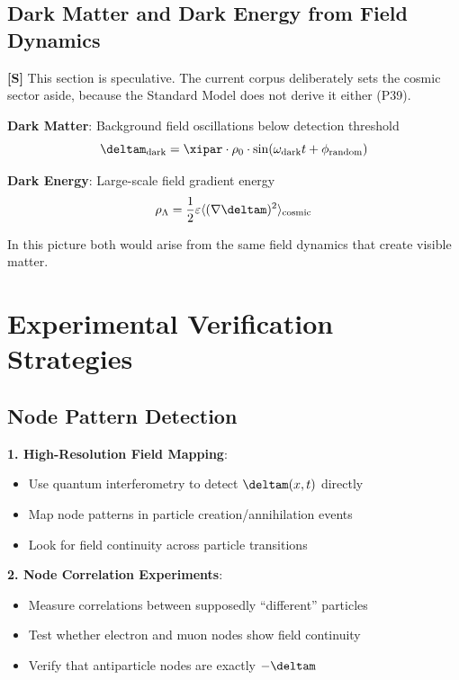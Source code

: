 	\subsection{Dark Matter and Dark Energy from Field Dynamics}
	
	\textbf{[S]} This section is speculative. The current corpus deliberately sets the cosmic sector aside, because the Standard Model does not derive it either (P39).
	
	\textbf{Dark Matter}: Background field oscillations below detection threshold
	\begin{equation}
		\deltam_{\text{dark}} = \xipar \cdot \rho_0 \cdot \sin(\omega_{\text{dark}} t + \phi_{\text{random}})
	\end{equation}
	
	\textbf{Dark Energy}: Large-scale field gradient energy
	\begin{equation}
		\rho_{\Lambda} = \frac{1}{2} \varepsilon \langle (\nabla \deltam)^2 \rangle_{\text{cosmic}}
	\end{equation}
	
	In this picture both would arise from the same field dynamics that create visible matter.
	
	\section{Experimental Verification Strategies}
	
	\subsection{Node Pattern Detection}
	
	\textbf{1. High-Resolution Field Mapping}:
	\begin{itemize}
		\item Use quantum interferometry to detect $\deltam(x,t)$ directly
		\item Map node patterns in particle creation/annihilation events
		\item Look for field continuity across particle transitions
	\end{itemize}
	
	\textbf{2. Node Correlation Experiments}:
	\begin{itemize}
		\item Measure correlations between supposedly ``different'' particles
		\item Test whether electron and muon nodes show field continuity
		\item Verify that antiparticle nodes are exactly $-\deltam$
	\end{itemize}
	
